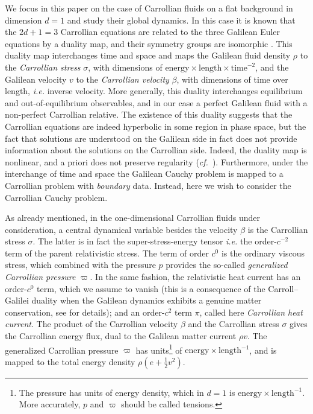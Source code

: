 \documentclass[11pt,a4paper,reqno]{amsart}
\numberwithin{equation}{section}
\theoremstyle{definition}
\theoremstyle{remark}
\begin{document}
We focus in this paper on the case of Carrollian fluids on a flat background in dimension $d=1$ and study their global dynamics. In this case it is known that the $2d+1 = 3$ Carrollian equations are related to the three Galilean Euler equations by a duality map, and their symmetry groups are isomorphic \cite{AthanasiouPetropoulosSchulzTaujanskas24a,AthanasiouPetropoulosSchulzTaujanskas24b,DuvalGibbonsHorvathyZhang2014,Bagchi2010}. This duality map interchanges time and space and maps the Galilean fluid density $\rho$ to the \emph{Carrollian stress} $\sigma$, with dimensions of $\text{energy}\times\text{length}\times\text{time}^{-2}$, and the Galilean velocity $v$ to the \emph{Carrollian velocity} $\beta$, with dimensions of time over length, \textit{i.e.} inverse velocity. More generally, this duality interchanges equilibrium and out-of-equilibrium observables, and in our case a perfect Galilean fluid with a non-perfect Carrollian relative. The existence of this duality suggests that the Carrollian equations are indeed hyperbolic in some region in phase space, but the fact that solutions are understood on the Galilean side in fact does not provide information about the solutions on the Carrollian side. Indeed, the duality map is nonlinear, and a priori does not preserve regularity (\textit{cf.}~\cite{AthanasiouPetropoulosSchulzTaujanskas24b}). Furthermore, under the interchange of time and space the Galilean Cauchy problem is mapped to a Carrollian problem with \emph{boundary} data. Instead, here we wish to consider the Carrollian Cauchy problem.

As already mentioned, in the one-dimensional Carrollian fluids under consideration, a central dynamical variable besides the velocity $\beta$ is the Carrollian stress $\sigma$. The latter is in fact the super-stress-energy tensor \emph{i.e.} the order-$c^{-2}$ term of the parent relativistic stress. The term of order $c^{0}$ is the ordinary viscous stress, which combined with the pressure $p$ provides the so-called \emph{generalized Carrollian pressure} $\varpi$. In the same fashion, the relativistic heat current has an order-$c^{0}$ term, which we assume to vanish (this is a consequence of the Carroll--Galilei duality when the Galilean dynamics exhibits a genuine matter conservation, see \cite{AthanasiouPetropoulosSchulzTaujanskas24a} for details); and an order-$c^{2}$ term $\pi$, called here \emph{Carrollian heat current}.
The product of the Carrollian velocity $\beta$ and the Carrollian stress $\sigma$ gives the Carrollian energy flux, dual to the Galilean matter current $\rho v$. The generalized 
 Carrollian pressure $\varpi$ has units\footnote{The pressure has units of energy density, which in $d=1$ is $\text{energy}\times\text{length}^{-1}$. More accurately, $p$ and $\varpi$ should be called tensions.} of $\text{energy}\times\text{length}^{-1}$, and is mapped to the total energy density $\rho (e + \frac{1}{2} v^2)$.
 
\end{document}
